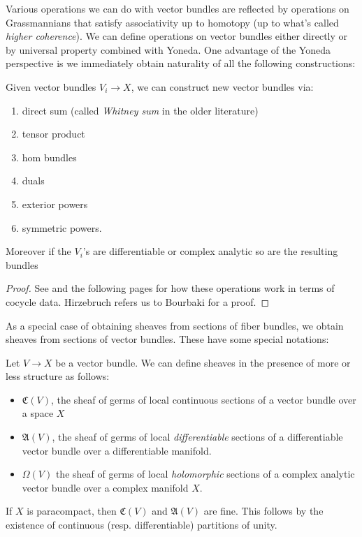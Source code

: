 \documentclass[11pt]{book}
\begin{document}
Various operations we can do with vector bundles are reflected by operations on Grassmannians that satisfy associativity up to homotopy (up to what's called \emph{higher coherence}). We can define operations on vector bundles either directly or by universal property combined with Yoneda. One advantage of the Yoneda perspective is we immediately obtain naturality of all the following constructions:

\begin{proposition} Given vector bundles $V_i \to X$, we can construct new vector bundles via:
\begin{enumerate}
    \item direct sum (called \emph{Whitney sum} in the older literature)
    \item tensor product
    \item hom bundles
    \item duals
    \item exterior powers
    \item symmetric powers.
\end{enumerate}
Moreover if the $V_i$'s are differentiable or complex analytic so are the resulting bundles
\end{proposition}
\begin{proof} See \cite[3.6.1]{Hirzebruch} and the following pages for how these operations work in terms of cocycle data. Hirzebruch refers us to Bourbaki for a proof.
\end{proof}

As a special case of obtaining sheaves from sections of fiber bundles, we obtain sheaves from sections of vector bundles. These have some special notations:

\begin{proposition}
Let $V \to X$ be a vector bundle. We can define sheaves in the presence of more or less structure as follows:
\begin{itemize}
    \item $\mathfrak{C}(V)$, the sheaf of germs of local continuous sections of a vector bundle over a space $X$
    \item $\mathfrak{A}(V)$, the sheaf of germs of local \emph{differentiable} sections of a differentiable vector bundle over a differentiable manifold.
    \item $\Omega(V)$ the sheaf of germs of local \emph{holomorphic} sections of a complex analytic vector bundle over a complex manifold $X$.
\end{itemize}
If $X$ is paracompact, then $\mathfrak{C}(V)$ and $\mathfrak{A}(V)$ are fine. This follows by the existence of continuous (resp. differentiable) partitions of unity.
\end{proposition}
\end{document}
